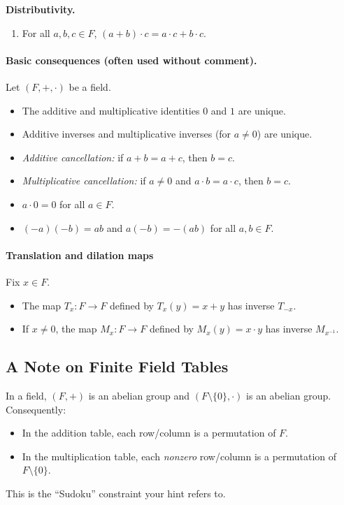 \documentclass[12pt]{article}
\begin{document}
\textbf{Distributivity.}
\begin{enumerate}[label=\textbf{(D)}, leftmargin=3em]
  \item For all $a,b,c\in F$, $(a+b)\cdot c = a\cdot c + b\cdot c$.
\end{enumerate}

\paragraph{Basic consequences (often used without comment).}
Let $(F,+,\cdot)$ be a field.
\begin{itemize}
  \item The additive and multiplicative identities $0$ and $1$ are unique.
  \item Additive inverses and multiplicative inverses (for $a\neq 0$) are unique.
  \item \emph{Additive cancellation:} if $a+b=a+c$, then $b=c$.
  \item \emph{Multiplicative cancellation:} if $a\neq 0$ and $a\cdot b=a\cdot c$, then $b=c$.
  \item $a\cdot 0=0$ for all $a\in F$.
  \item $(-a)(-b)=ab$ and $a(-b)=-(ab)$ for all $a,b\in F$.
\end{itemize}

\paragraph{Translation and dilation maps}
Fix $x\in F$.
\begin{itemize}
  \item The map $T_x:F\to F$ defined by $T_x(y)=x+y$ has inverse $T_{-x}$.
  \item If $x\neq 0$, the map $M_x:F\to F$ defined by $M_x(y)=x\cdot y$ has inverse $M_{x^{-1}}$.
\end{itemize}

\subsection*{A Note on Finite Field Tables}
In a field, $(F,+)$ is an abelian group and $(F\setminus\{0\},\cdot)$ is an abelian group.
Consequently:
\begin{itemize}
  \item In the addition table, each row/column is a permutation of $F$.
  \item In the multiplication table, each \emph{nonzero} row/column is a permutation of $F\setminus\{0\}$.
\end{itemize}
This is the ``Sudoku'' constraint your hint refers to.
\end{document}
